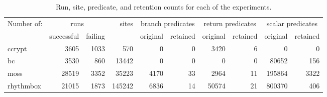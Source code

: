 \begin{table*}
\centering

\begin{tabular}{|l|r|r|r|r|r|r|r|r|r|}
\hline
Number of: & \multicolumn{2}{c|}{runs}  & sites  & 
\multicolumn{2}{c|}{branch predicates} & \multicolumn{2}{c|}{return 
predicates} & \multicolumn{2}{c|}{scalar predicates}\\ \cline{2-3} \cline{5-6} \cline{7-8} \cline{9-10}
           & successful & failing       &        & original & retained & 
original & retained & original & retained \\
\hline
\hline
ccrypt     &  3605      &  1033         &    570 &      0 &          0 &     
3420 &        6 &        0 &        0 \\
\hline
bc         &  3530      &   860         &  13442 &      0 &          0 &        
0 &        0 &    80652 &      156 \\
\hline
moss       & 28519      &  3352         &  35223 &   4170 &         33 &     
2964 &       11 &   195864 &     3322 \\
\hline
rhythmbox  & 21015      &  1873         & 145242 &   6836 &         14 &    
50574 &       21 &   800370 &      406 \\
\hline
\end{tabular}
\caption{Run, site, predicate, and retention counts for each of the experiments.}
\label{tab:exps}
\end{table*}

